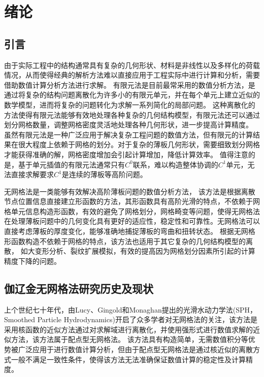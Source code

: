\chapter{绪论}
\section{引言}
由于实际工程中的结构通常具有复杂的几何形状、材料是非线性以及多样化的荷载情况，从而使得经典的解析方法难以直接应用于工程实际中进行计算和分析，需要借助数值计算分析方法进行求解。
有限元法\cite{hughes2000,2014Computer,stein2018,2013Nonlinear}是目前最常采用的数值分析方法，是通过将复杂的结构问题离散化为许多小的有限元单元，并在每个单元上建立近似的数学模型，进而将复杂的问题转化为求解一系列简化的局部问题。
这种离散化的方法使得有限元法能够有效地处理各种复杂的几何结构模型，有限元法还可以通过划分网格数量，调整网格密度灵活地处理各种几何形状，进一步提高计算精度。
虽然有限元法是一种广泛应用于解决复杂工程问题的数值方法，但有限元的计算结果在很大程度上依赖于网格的划分。对于复杂的薄板几何形状，需要细致划分网格才能获得准确的解，网格密度增加会引起计算增加，降低计算效率。
值得注意的是，基于单元插值的有限元法通常只有$C^0$联系，难以构造整体协调的$C^1$单元，无法直接求解要求$C^1$是连续的薄板等高阶问题。

无网格法\cite{chen2017,belytschkoMeshlessMethodsOverview1996b}是一类能够有效解决高阶薄板问题的数值分析方法，
该方法是根据离散节点位置信息直接建立形函数的方法，其形函数具有高阶光滑的特点，不依赖于网格单元信息构造形函数，有效的避免了网格划分，网格畸变等问题，使得无网格法在处理薄板问题\cite{邓立克2019薄板分析的线性基梯度光滑伽辽金无网格法}中的几何变化具有更好的适应性，稳定性和可靠性。无网格法可以直接考虑薄板的厚度变化，能够准确地捕捉薄板的弯曲和扭转状态。
根据无网格形函数构造不依赖于网格的特点，该方法也适用于其它复杂的几何结构模型的离散，
如大变形分析\cite{陈嵩涛2020几何非线性分析的高效高阶无网格法}、裂纹扩展模拟\cite{GaoXin2018}，有效的提高因为网格划分因素所引起的计算精度下降的问题。

\section{伽辽金无网格法研究历史及现状}
上个世纪七十年代，由Lucy\cite{1977A}、Gingold和Monaghan\cite{gingold1977}提出的光滑水动力学法(SPH，Smoothed Particle Hydrodynamics)开启了众多学者对无网格法的关注，该方法是采用核函数的近似方法通过对求解域进行离散化，并使用强形式进行数值求解的近似方法，该方法属于配点型无网格法。
该方法具有构造简单，无需数值积分等优势被广泛应用于进行数值计算分析，但由于配点型无网格法是通过核近似的离散方式一般不满足一致性条件，使得该方法无法准确保证数值计算的稳定性及计算精度\cite{auricchio2010a,wang2018a,wang2020,gomez2016}。

